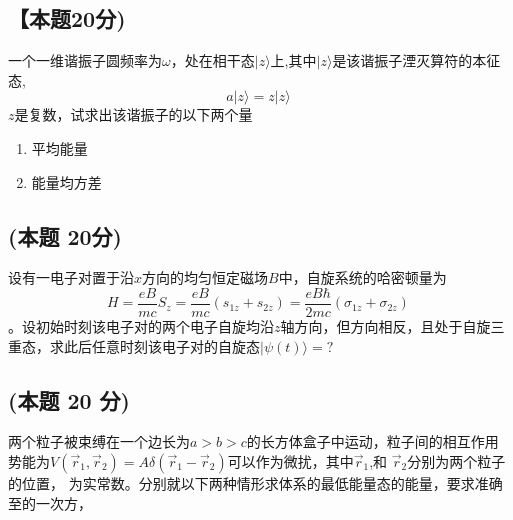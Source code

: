 \subsection{【本题20分)}
一个一维谐振子圆频率为$\omega$，处在相干态$|z\rangle$上,其中$|z\rangle$是该谐振子湮灭算符的本征态,
$$a |z\rangle = z |z\rangle~$$
$z$是复数，试求出该谐振子的以下两个量
\begin{enumerate}
\item 平均能量
\item 能量均方差
\end{enumerate}
\subsection{(本题 20分)}
设有一电子对置于沿$x$方向的均匀恒定磁场$B$中，自旋系统的哈密顿量为
$$H = \frac{eB}{mc} S_z = \frac{eB}{mc} \left( s_{1z} + s_{2z} \right) = \frac{eB\hbar}{2mc} \left( \sigma_{1z} + \sigma_{2z} \right)~$$。设初始时刻该电子对的两个电子自旋均沿$z$轴方向，但方向相反，且处于自旋三重态，求此后任意时刻该电子对的自旋态$|\psi(t)\rangle=?$
\subsection{(本题 20 分)}
两个粒子被束缚在一个边长为$a>b>c$的长方体盒子中运动，粒子间的相互作用势能为$V(\vec{r}_1, \vec{r}_2) = A\delta(\vec{r}_1 - \vec{r}_2)$可以作为微扰，其中$\vec{r}_1$,和 $\vec{r}_2$分别为两个粒子的位置， 为实常数。分别就以下两种情形求体系的最低能量态的能量，要求准确至的一次方，